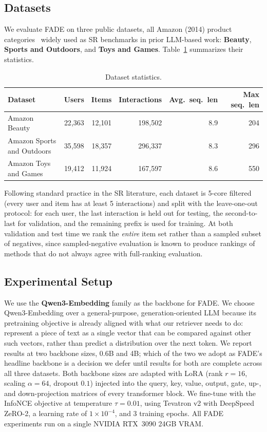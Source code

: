 \documentclass[runningheads]{llncs}
\begin{document}
\subsection{Datasets}
\label{sec:datasets}
We evaluate FADE on three public datasets, all Amazon (2014) product categories~\cite{mcauley2015} widely
used as SR benchmarks in prior LLM-based work: \textbf{Beauty}, \textbf{Sports and Outdoors}, and
\textbf{Toys and Games}. Table~\ref{tab:datasets} summarizes their statistics.

\begin{table}[H]
\centering
\caption{Dataset statistics.}
\label{tab:datasets}
\begin{tabular}{lrrrrr}
\toprule
Dataset & Users & Items & Interactions & Avg.\ seq.\ len & Max seq.\ len \\
\midrule
Amazon Beauty              & 22{,}363 & 12{,}101 & 198{,}502 & 8.9 & 204 \\
Amazon Sports and Outdoors & 35{,}598 & 18{,}357 & 296{,}337 & 8.3 & 296 \\
Amazon Toys and Games      & 19{,}412 & 11{,}924 & 167{,}597 & 8.6 & 550 \\
\bottomrule
\end{tabular}
\end{table}

Following standard practice in the SR literature, each dataset is 5-core filtered (every user and item has at least 5 interactions) and split with the leave-one-out protocol: for each user, the last interaction is held out for testing, the second-to-last for validation, and the remaining prefix is used for training. At both validation and test time we rank the \emph{entire} item set rather than a sampled subset of negatives, since sampled-negative evaluation is known to produce rankings of methods that do not always agree with full-ranking evaluation.

\subsection{Experimental Setup}
\label{sec:setup}
We use the \textbf{Qwen3-Embedding} family as the backbone for FADE. We choose Qwen3-Embedding over a general-purpose, generation-oriented LLM because its pretraining objective is already aligned with what our retriever needs to do: represent a piece of text as a single vector that can be compared against other such vectors, rather than predict a distribution over the next token. We report results at two backbone sizes, 0.6B and 4B; which of the two we adopt as FADE's headline backbone is a decision we defer until results for both are complete across all three datasets. Both backbone sizes are adapted with LoRA (rank $r=16$, scaling $\alpha=64$, dropout $0.1$) injected into the query, key, value, output, gate, up-, and down-projection matrices of every transformer block. We fine-tune with the InfoNCE objective at temperature $\tau=0.01$, using Tevatron v2 with DeepSpeed ZeRO-2, a learning rate of $1\times10^{-4}$, and 3 training epochs. All FADE experiments run on a single NVIDIA RTX~3090 24GB VRAM.
\end{document}
